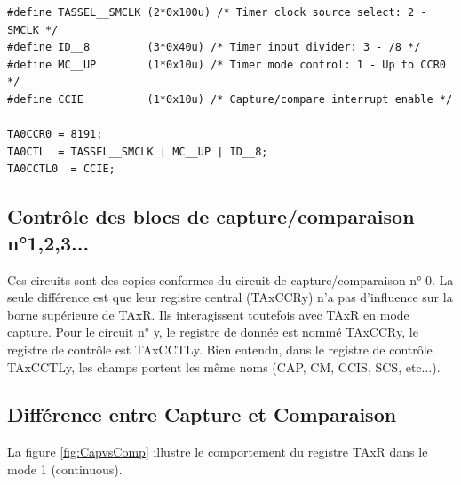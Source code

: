 \lstset{style=customc}
\begin{lstlisting}
#define TASSEL__SMCLK (2*0x100u) /* Timer clock source select: 2 - SMCLK */
#define ID__8         (3*0x40u) /* Timer input divider: 3 - /8 */
#define MC__UP        (1*0x10u) /* Timer mode control: 1 - Up to CCR0 */
#define CCIE          (1*0x10u) /* Capture/compare interrupt enable */

TA0CCR0 = 8191;
TA0CTL  = TASSEL__SMCLK | MC__UP | ID__8;
TA0CCTL0  = CCIE;
\end{lstlisting}

\subsection{Contrôle des blocs de capture/comparaison n°1,2,3...}
Ces circuits sont des copies conformes du circuit de capture/comparaison n° 0. La seule différence est que leur registre central (TAxCCRy) n'a pas d'influence sur la borne supérieure de TAxR. Ils interagissent toutefois avec TAxR en mode capture.
Pour le circuit n° y, le registre de donnée est nommé TAxCCRy, le registre de contrôle est TAxCCTLy.
Bien entendu, dans le registre de contrôle TAxCCTLy, les champs portent les même noms (CAP, CM, CCIS, SCS, etc...).

\subsection{Différence entre Capture et Comparaison}
La figure \ref{fig:CapvsComp} illustre le comportement du registre TAxR dans le mode 1 (continuous).

